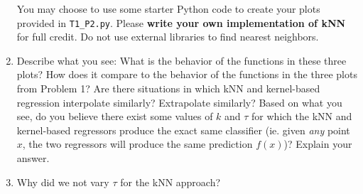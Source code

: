 \documentclass[submit]{harvardml}
\begin{document}
\begin{problem}
\begin{enumerate}
  You may choose to use some starter Python code to create your plots
  provided in \verb|T1_P2.py|.  Please \textbf{write your own
    implementation of kNN} for full credit.  Do not use external
  libraries to find nearest neighbors.
  
\item Describe what you see: What is the behavior of the functions in
  these three plots?  How does it compare to the behavior of the
  functions in the three plots from Problem 1?  Are there situations
  in which kNN and kernel-based regression interpolate similarly?
  Extrapolate similarly?  Based on what you see, do you believe there
  exist some values of $k$ and $\tau$ for which the kNN and kernel-based regressors produce the exact same classifier (ie. given \textit{any} point $x$, the two regressors will produce the same prediction $f(x)$)? Explain your answer.
  
\item Why did we not vary $\tau$ for the kNN approach?

\end{enumerate}

\end{problem}


\newpage 

\end{document}
